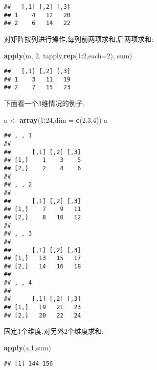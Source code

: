 \documentclass[]{ctexbook}
\newenvironment{Shaded}{\begin{snugshade}}{\end{snugshade}}
\newcommand{\DataTypeTok}[1]{\textcolor[rgb]{0.13,0.29,0.53}{#1}}
\newcommand{\DecValTok}[1]{\textcolor[rgb]{0.00,0.00,0.81}{#1}}
\newcommand{\KeywordTok}[1]{\textcolor[rgb]{0.13,0.29,0.53}{\textbf{#1}}}
\newcommand{\NormalTok}[1]{#1}
\newcommand{\OperatorTok}[1]{\textcolor[rgb]{0.81,0.36,0.00}{\textbf{#1}}}
\newcommand{\StringTok}[1]{\textcolor[rgb]{0.31,0.60,0.02}{#1}}
\begin{document}
\begin{verbatim}
##   [,1] [,2] [,3]
## 1    4   12   20
## 2    6   14   22
\end{verbatim}

对矩阵按列进行操作,每列前两项求和,后两项求和:

\begin{Shaded}
\begin{Highlighting}[]
\KeywordTok{apply}\NormalTok{(m, }\DecValTok{2}\NormalTok{, tapply,}\KeywordTok{rep}\NormalTok{(}\DecValTok{1}\OperatorTok{:}\DecValTok{2}\NormalTok{,}\DataTypeTok{each=}\DecValTok{2}\NormalTok{), sum)}
\end{Highlighting}
\end{Shaded}

\begin{verbatim}
##   [,1] [,2] [,3]
## 1    3   11   19
## 2    7   15   23
\end{verbatim}

下面看一个3维情况的例子.

\begin{Shaded}
\begin{Highlighting}[]
\NormalTok{a <-}\StringTok{ }\KeywordTok{array}\NormalTok{(}\DecValTok{1}\OperatorTok{:}\DecValTok{24}\NormalTok{,}\DataTypeTok{dim =} \KeywordTok{c}\NormalTok{(}\DecValTok{2}\NormalTok{,}\DecValTok{3}\NormalTok{,}\DecValTok{4}\NormalTok{))}
\NormalTok{a}
\end{Highlighting}
\end{Shaded}

\begin{verbatim}
## , , 1
## 
##      [,1] [,2] [,3]
## [1,]    1    3    5
## [2,]    2    4    6
## 
## , , 2
## 
##      [,1] [,2] [,3]
## [1,]    7    9   11
## [2,]    8   10   12
## 
## , , 3
## 
##      [,1] [,2] [,3]
## [1,]   13   15   17
## [2,]   14   16   18
## 
## , , 4
## 
##      [,1] [,2] [,3]
## [1,]   19   21   23
## [2,]   20   22   24
\end{verbatim}

固定1个维度,对另外2个维度求和:

\begin{Shaded}
\begin{Highlighting}[]
\KeywordTok{apply}\NormalTok{(a,}\DecValTok{1}\NormalTok{,sum)}
\end{Highlighting}
\end{Shaded}

\begin{verbatim}
## [1] 144 156
\end{verbatim}
\end{document}

